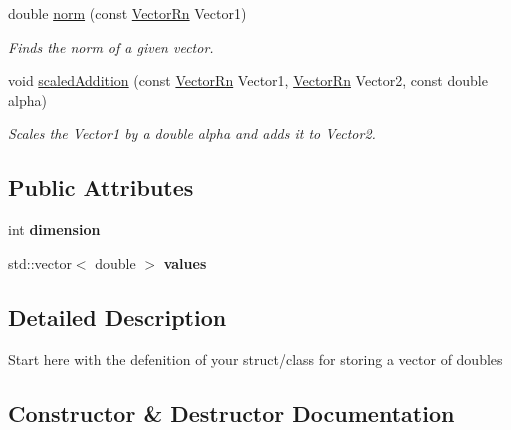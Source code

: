 \begin{DoxyCompactItemize}
double \mbox{\hyperlink{classpnla_1_1VectorRn_a7774eecc9a019112934833d2e63b3fa5}{norm}} (const \mbox{\hyperlink{classpnla_1_1VectorRn}{Vector\+Rn}} Vector1)
\begin{DoxyCompactList}\small\item\em Finds the norm of a given vector. \end{DoxyCompactList}\item 
void \mbox{\hyperlink{classpnla_1_1VectorRn_aba4879f9a6b1414d83ba17beed034361}{scaled\+Addition}} (const \mbox{\hyperlink{classpnla_1_1VectorRn}{Vector\+Rn}} Vector1, \mbox{\hyperlink{classpnla_1_1VectorRn}{Vector\+Rn}} Vector2, const double alpha)
\begin{DoxyCompactList}\small\item\em Scales the \textquotesingle{}Vector1\textquotesingle{} by a double \textquotesingle{}alpha\textquotesingle{} and adds it to \textquotesingle{}Vector2\textquotesingle{}. \end{DoxyCompactList}\end{DoxyCompactItemize}
\subsection*{Public Attributes}
\begin{DoxyCompactItemize}
\item 
\mbox{\label{classpnla_1_1VectorRn_af130ef239860e17ab15644b1bd6d5896}} 
int {\bfseries dimension}
\item 
\mbox{\label{classpnla_1_1VectorRn_ab8d6d85f5ba243494a38842fe2e9a21d}} 
std\+::vector$<$ double $>$ {\bfseries values}
\end{DoxyCompactItemize}


\subsection{Detailed Description}
Start here with the defenition of your struct/class for storing a vector of doubles 

\subsection{Constructor \& Destructor Documentation}
\mbox{\label{classpnla_1_1VectorRn_abd7ba1abf8c8943bd1ad2f00eb8f5388}} 
